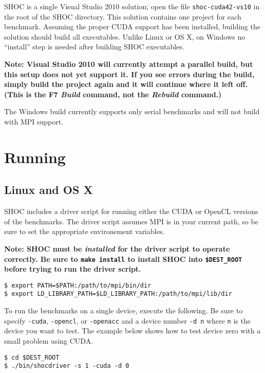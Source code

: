 \documentclass[11pt]{article}
\begin{document}
SHOC is a single Visual Studio 2010 solution; open
the file {\tt shoc-cuda42-vs10} in the root 
of the SHOC directory.  This solution contains
one project for each benchmark.  Assuming
the proper CUDA support has been installed,
building the solution should build all executables.
Unlike Linux or OS X, on Windows no ``install'' step is needed after building
SHOC executables.

{\bf Note: Visual Studio 2010 will currently attempt
a parallel build, but this setup does not yet
support it.  If you see errors during the build,
simply build the project again and it will 
continue where it left off.  (This is
the F7 {\it Build} command, not the {\it Rebuild}
command.)}

The Windows build currently supports only serial
benchmarks and will not build with MPI support.

\section{Running}\label{sec:running}

\subsection{Linux and OS X}

SHOC includes a driver script for running either the CUDA or OpenCL versions
of the benchmarks. The driver script assumes MPI is in your current path,
so be sure to set the appropriate environement variables.

{\bf Note: SHOC must be {\em installed} for the driver script to operate
correctly.  Be sure to \verb+make install+ to install SHOC into 
\verb+$DEST_ROOT+ before trying to run the driver script.}

\begin{Verbatim}[frame=single]
$ export PATH=$PATH:/path/to/mpi/bin/dir
$ export LD_LIBRARY_PATH=$LD_LIBRARY_PATH:/path/to/mpi/lib/dir
\end{Verbatim}

To run the benchmarks on a single device, execute the following. Be sure
to specify \verb+-cuda+, \verb+-opencl+, or \verb+-openacc+ and a device 
number \verb+-d n+
where \verb+n+ is the device you want to test. The example below shows how
to test device zero with a small problem using CUDA.

\begin{Verbatim}[frame=single]
$ cd $DEST_ROOT
$ ./bin/shocdriver -s 1 -cuda -d 0
\end{Verbatim}
\end{document}
